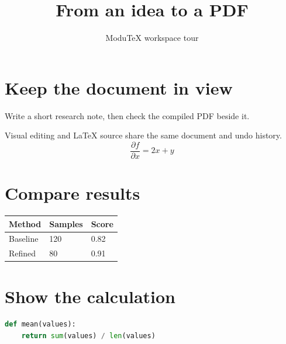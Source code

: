 \documentclass{article}
\title{From an idea to a PDF}
\author{ModuTeX workspace tour}
\date{}
\begin{document}
\maketitle
\section{Keep the document in view}
Write a short research note, then check the compiled PDF beside it.
\par
Visual editing and LaTeX source share the same document and undo history.
\[\frac{\partial f}{\partial x}=2x+y\]
\section{Compare results}
\begin{center}
\begin{tabular}{p{}p{}p{}}
\hline
\textbf{Method} & \textbf{Samples} & \textbf{Score} \\
\hline
Baseline & 120 & 0.82 \\
Refined & 80 & 0.91 \\
\hline
\end{tabular}
\end{center}
\section{Show the calculation}
\begin{lstlisting}[language=Python,name=python,xleftmargin=\parindent]
def mean(values):
    return sum(values) / len(values)
\end{lstlisting}
\end{document}
